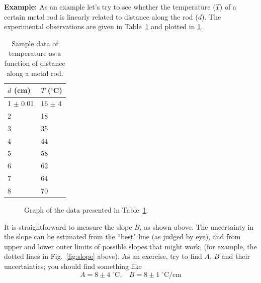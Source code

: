 {\bf Example: }
     As an example let's try to see whether the temperature ($T$)
of a certain metal rod is linearly related to distance along the
rod ($d$).  The experimental observations are given in Table~\ref{table:temp}
and plotted in \ref{fig:temp}.
\begin{table}[h]
\begin{center}
\begin{tabular}{|ll|}
\hline
$d$ (cm) &\hspace{5pt} $T$ ($^{\circ}$C)  \\ \hline
 1 $\pm$ 0.01& \hspace{5pt} 16 $\pm$ 4  \\
2& \hspace{5pt} 18  \\
3& \hspace{5pt} 35  \\
4& \hspace{5pt} 44  \\
5& \hspace{5pt} 58  \\
6& \hspace{5pt} 62  \\
7& \hspace{5pt} 64  \\
8& \hspace{5pt} 70  \\  \hline
\end{tabular}
\end{center}
\caption{Sample data of temperature as a function of distance along a metal
         rod.  \label{table:temp}}
\end{table}


\begin{figure}[!hbt]     %
\begin{center}
{}
\end{center}
\caption{Graph of the data presented in Table~\protect\ref{table:temp}.
          \label{fig:temp}}
\end{figure}

It is straightforward to measure the slope $B$, as shown above.  The
uncertainty in the slope can be
estimated from the ``best" line (as judged by eye), and from
upper and lower outer limits of possible slopes that might
work, (for example, the dotted lines in Fig.~\ref{fig:slope} above).
As an exercise, try to find $A$, $B$ and their
uncertainties; you should find something like
\begin{equation}
A  =  8 \pm 4 \;^{\circ}\mbox{C}, \ \ \ \
B   =  8 \pm 1 \;^{\circ}\mbox{C/cm}
\end{equation}

